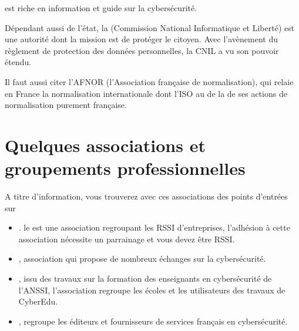   est riche en information et guide sur la cybersécurité.

Dépendant aussi de l'état, la  (Commission National Informatique et Liberté) est une autorité dont la mission est de protéger le citoyen. Avec l'avènement du règlement de protection des données personnelles, la CNIL a vu son pouvoir étendu.  

Il faut aussi citer l'AFNOR (l'Association française de normalisation), qui relaie en France la normalisation internationale dont l'ISO au de la de ses actions de normalisation purement française.

\section{Quelques associations et groupements professionnelles} 

A titre d'information, vous trouverez avec ces associations des points d'entrées sur 

\begin{itemize}
  \item {}.
le  est une association regroupant les RSSI d'entreprises, l'adhésion à cette association nécessite un parrainage et vous devez être RSSI.

  \item{}
, association qui propose de nombreux échanges sur la cybersécurité.

  \item{}
, issu des travaux sur la formation des enseignants en cybersécurité de l'ANSSI, l'association regroupe les écoles et les utilisateurs des travaux de CyberEdu.

  \item{}
, regroupe les éditeurs et fournisseurs de services français en cybersécurité.
\end{itemize}

